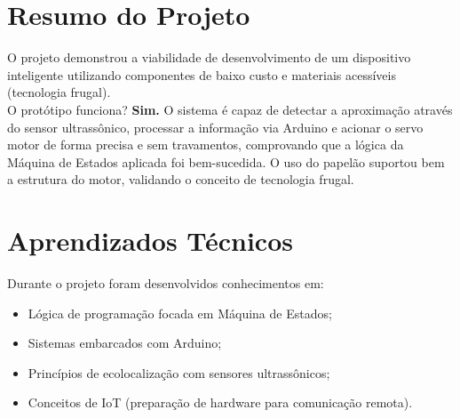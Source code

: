 \documentclass[12pt, openany, oneside, a4paper, brazilian]{abntex2}
\begin{document}
\section{Resumo do Projeto}

O projeto demonstrou a viabilidade de desenvolvimento de um dispositivo inteligente utilizando componentes de baixo custo e materiais acessíveis (tecnologia frugal).\\
O protótipo funciona? \textbf{Sim.} O sistema é capaz de detectar a aproximação através do sensor ultrassônico, processar a informação via Arduino e acionar o servo motor de forma precisa e sem travamentos, comprovando que a lógica da Máquina de Estados aplicada foi bem-sucedida. O uso do papelão suportou bem a estrutura do motor, validando o conceito de tecnologia frugal.
\section{Aprendizados Técnicos}

Durante o projeto foram desenvolvidos conhecimentos em:

\begin{itemize}
    \item Lógica de programação focada em Máquina de Estados;
    \item Sistemas embarcados com Arduino;
    \item Princípios de ecolocalização com sensores ultrassônicos;
    \item Conceitos de IoT (preparação de hardware para comunicação remota).
\end{itemize}
\end{document}

